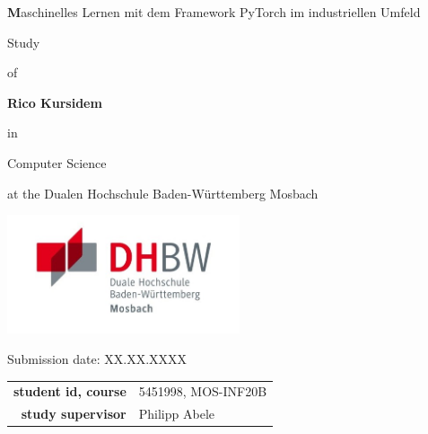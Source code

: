 
\def\title{Maschinelles Lernen mit dem Framework PyTorch im industriellen Umfeld}
\def\abgabe{XX.XX.XXXX}

\begin{titlepage}
	
	
	
	\vspace{5pt}
	
	\begin{center}
		
		\Large \textbf\title
		
		\vspace{50pt}
		
		\large Study
		
		of
		
		\large \textbf{Rico Kursidem} 
		
		\vspace{15pt}
		
		in
		
		\large Computer Science
		
		at the Dualen Hochschule Baden-Württemberg Mosbach

        \vspace{10pt}

        \includegraphics[height=3.5cm]{images/dhbw-logo.jpg}
		
		\vspace{20pt}
		
		\large Submission date: \abgabe
		
		\vspace{30pt}

		
		\begin{table}[h]
			\centering
			\begin{tabular}{r l}
				\large\textbf{student id, course} & \large 5451998, MOS-INF20B \\
                \large\textbf{study supervisor} & \large Philipp Abele \\
			\end{tabular}
			
		\end{table}
		
	\end{center}
	
	
\end{titlepage}
